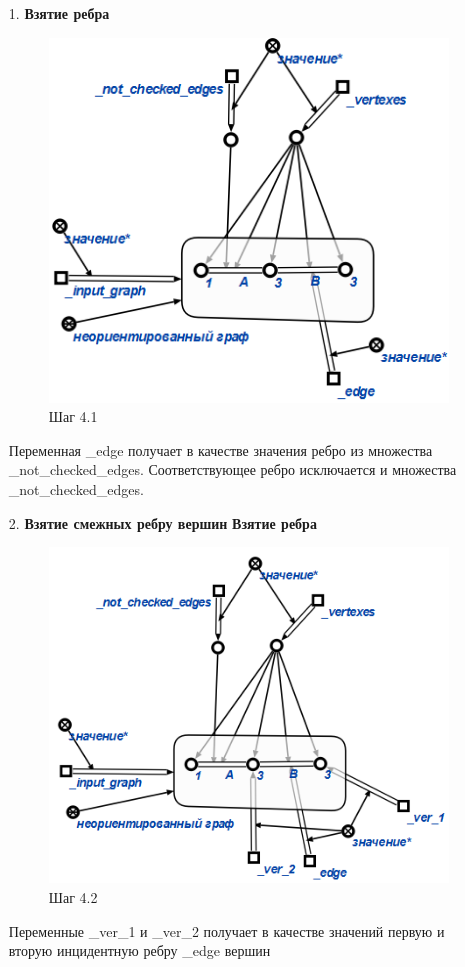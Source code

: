 \begin{enumerate}
  \begin{enumerate}
   \item[1.]
   \textbf{Взятие ребра}
   \begin{figure}[H]
     \centering
     \includegraphics[scale=0.7]{algo/41.png}
     \caption{Шаг 4.1}
   \end{figure}
   Переменная \_edge получает в качестве значения ребро из множества
   \_not\_checked\_edges. Соответствующее ребро исключается и
   множества \_not\_checked\_edges.
    
   \item[2.]
   \textbf{Взятие смежных ребру вершин}
   \textbf{Взятие ребра}
   \begin{figure}[H]
     \centering
     \includegraphics[scale=0.7]{algo/42.png}
     \caption{Шаг 4.2}
   \end{figure}
   Переменные \_ver\_1 и \_ver\_2 получает в качестве значений первую и вторую инцидентную ребру \_edge вершин
   

\end{enumerate}
\end{enumerate}
